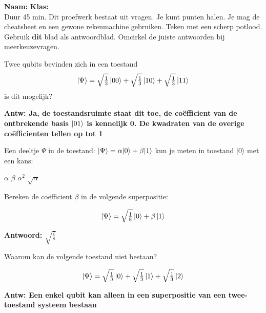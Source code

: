 \documentclass[a4paper, addpoints, 12pt
    , noanswers    %
    ]{exam}
\newcommand{\timelimit}{45 min.}
\begin{document}
\hfill\textbf{Naam:}\enspace\makebox[2in]{\hrulefill} \textbf{Klas:}\enspace\makebox[1in]{\hrulefill} \\

Duur \timelimit
Dit proefwerk bestaat uit \numquestions{} vragen. Je kunt \numpoints{} punten halen. %
Je mag de cheatsheet en een gewone rekenmachine gebruiken. Teken met een scherp potlood. Gebruik \textbf{dit} blad als antwoordblad. Omcirkel de juiste antwoorden bij meerkeuzevragen.

\begin{questions}
\pointsinmargin  %

\question[1]
Twee qubits bevinden zich in een toestand
\[\ket{\Psi} = \sqrt{\tfrac{1}{3}}\ket{00}+ \sqrt{\tfrac{1}{3}}\ket{10}+\sqrt{\tfrac{1}{3}}\ket{11}\]
is dit mogelijk?

\ifprintanswers
\textbf{Antw: Ja, de toestandsruimte staat dit toe, de co\"efficient van de ontbrekende basis $\ket{01}$ is kennelijk 0. De kwadraten van de overige co\"efficienten tellen op tot 1
}
\else
\fillwithlines{.5in}
\fi


\question[1]
Een deeltje $\Psi$ in de toestand: $\ket{\Psi}=\alpha |0 \rangle + \beta |1 \rangle$
kun je meten in toestand $| 0 \rangle$ met een kans:

\begin{choices}
\choice $\alpha$
\choice $\beta$
\correctchoice $\alpha^2$
\choice $\sqrt{\alpha}$
\end{choices}

\question[1]
Bereken de co\"efficient $\beta$ in de volgende superpositie:

\[\ket{\Psi} = \sqrt{\tfrac{1}{8}}\ket{0}+ \beta\ket{1}\]

\ifprintanswers
\textbf{Antwoord: $\sqrt{\tfrac{7}{8}}$
}
\else
\fillwithlines{.5in}
\fi

\question[1]
Waarom kan de volgende toestand niet bestaan?

\[\ket{\Psi} = \sqrt{\tfrac{1}{3}}\ket{0}+ \sqrt{\tfrac{1}{3}}\ket{1}+\sqrt{\tfrac{1}{3}}\ket{2}\]

\ifprintanswers
\textbf{Antw: Een enkel qubit kan alleen in een superpositie van een twee-toestand systeem bestaan
}
\else
\fillwithlines{.5in}
\fi


\end{questions}
\end{document}
